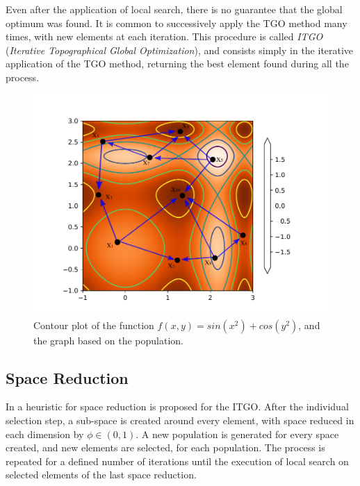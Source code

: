 Even after the application of local search, there is no guarantee that the global optimum was found. It is common to successively apply the TGO method many times, with new elements at each iteration. This procedure is called \textit{ITGO} (\textit{Iterative Topographical Global Optimization}), and consists simply in the iterative application of the TGO method, returning the best element found during all the process.



\begin{figure}[tp]
\begin{center}
\includegraphics[scale=0.6]{fig_1.pdf}
\end{center}
\captionsetup{justification=centering}
\vspace*{-7mm} 
\caption{Contour plot of the function $f(x, y) = sin(x^2) + cos(y^2)$, and the graph based on the population.}\label{fig:Graph}
\end{figure}


\subsection{Space Reduction}

In \cite{ITGO4} a heuristic for space reduction is proposed for the ITGO. After the individual selection step, a sub-space is created around every element, with space reduced in each dimension by $\phi \in (0, 1)$. A new population is generated for every space created, and new elements are selected, for each population. The process is repeated for a defined number of iterations until the execution of local search on selected elements of the last space reduction.

